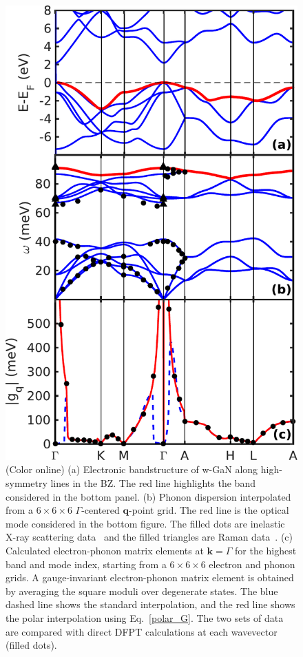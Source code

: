 \documentclass[final,3p,times,twocolumn]{elsarticle}
\begin{document}
\begin{figure}[t!]
  \centering
  \includegraphics[width=0.9\linewidth]{Interpolation_full3.pdf}
  \caption{\label{GaN-interpolation} (Color online) (a) Electronic bandstructure of w-GaN along high-symmetry lines in the BZ. The red line highlights the band considered in the bottom panel. (b) Phonon dispersion interpolated from a $6\times6\times6$ $\Gamma$-centered $\mathbf{q}$-point grid. The red line is the optical mode considered in the bottom figure. The filled dots are inelastic X-ray scattering data~\cite{Ruf2001} and the filled triangles are Raman data~\cite{Siegle1997}.  (c) Calculated electron-phonon matrix elements at $\mathbf{k}=\Gamma$ for the highest band and mode index, starting from a $6\times6\times6$ electron and phonon grids. A gauge-invariant electron-phonon matrix element is obtained by averaging the square moduli over degenerate states. The blue dashed line shows the standard interpolation, and the red line shows the polar interpolation using Eq.~\eqref{polar_G}. The two sets of data are compared with direct DFPT calculations at each wavevector (filled dots).   }
\end{figure}
\end{document}
